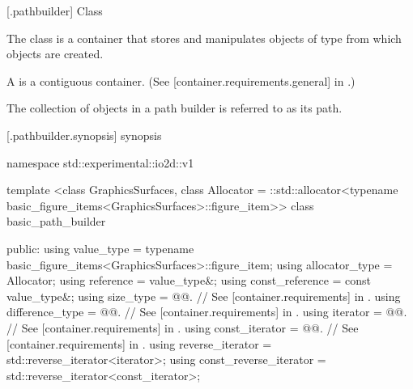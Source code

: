  [\iotwod.pathbuilder] {Class }

\pnum
{}%
The class  is a container that stores and manipulates objects of type  from which  objects are created.

\pnum
A  is a contiguous container. (See [container.requirements.general] in \cppseventeen.)

\pnum
The collection of  objects in a path builder is referred to as its path.

 [\iotwod.pathbuilder.synopsis] { synopsis}%

\begin{codeblock}
namespace std::experimental::io2d::v1 {
  template <class GraphicsSurfaces,
            class Allocator = ::std::allocator<typename
              basic_figure_items<GraphicsSurfaces>::figure_item>>
  class basic_path_builder {
  public:
    using value_type             = typename basic_figure_items<GraphicsSurfaces>::figure_item;
    using allocator_type         = Allocator;
    using reference              = value_type&;
    using const_reference        = const value_type&;
    using size_type              = @@. // See [container.requirements] in \cppseventeen.
    using difference_type        = @@. // See [container.requirements] in \cppseventeen.
    using iterator               = @@. // See [container.requirements] in \cppseventeen.
    using const_iterator         = @@. // See [container.requirements] in \cppseventeen.
    using reverse_iterator       = std::reverse_iterator<iterator>;
    using const_reverse_iterator = std::reverse_iterator<const_iterator>;

}}
\end{codeblock}
